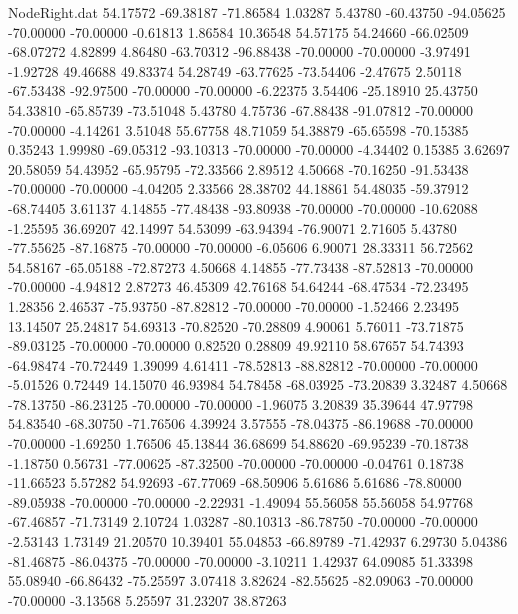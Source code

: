 \begin{filecontents}{NodeRight.dat}
  54.17572  -69.38187  -71.86584     1.03287    5.43780  -60.43750  -94.05625  -70.00000  -70.00000   -0.61813    1.86584   10.36548   54.57175
  54.24660  -66.02509  -68.07272     4.82899    4.86480  -63.70312  -96.88438  -70.00000  -70.00000   -3.97491   -1.92728   49.46688   49.83374
  54.28749  -63.77625  -73.54406    -2.47675    2.50118  -67.53438  -92.97500  -70.00000  -70.00000   -6.22375    3.54406  -25.18910   25.43750
  54.33810  -65.85739  -73.51048     5.43780    4.75736  -67.88438  -91.07812  -70.00000  -70.00000   -4.14261    3.51048   55.67758   48.71059
  54.38879  -65.65598  -70.15385     0.35243    1.99980  -69.05312  -93.10313  -70.00000  -70.00000   -4.34402    0.15385    3.62697   20.58059
  54.43952  -65.95795  -72.33566     2.89512    4.50668  -70.16250  -91.53438  -70.00000  -70.00000   -4.04205    2.33566   28.38702   44.18861
  54.48035  -59.37912  -68.74405     3.61137    4.14855  -77.48438  -93.80938  -70.00000  -70.00000  -10.62088   -1.25595   36.69207   42.14997
  54.53099  -63.94394  -76.90071     2.71605    5.43780  -77.55625  -87.16875  -70.00000  -70.00000   -6.05606    6.90071   28.33311   56.72562
  54.58167  -65.05188  -72.87273     4.50668    4.14855  -77.73438  -87.52813  -70.00000  -70.00000   -4.94812    2.87273   46.45309   42.76168
  54.64244  -68.47534  -72.23495     1.28356    2.46537  -75.93750  -87.82812  -70.00000  -70.00000   -1.52466    2.23495   13.14507   25.24817
  54.69313  -70.82520  -70.28809     4.90061    5.76011  -73.71875  -89.03125  -70.00000  -70.00000    0.82520    0.28809   49.92110   58.67657
  54.74393  -64.98474  -70.72449     1.39099    4.61411  -78.52813  -88.82812  -70.00000  -70.00000   -5.01526    0.72449   14.15070   46.93984
  54.78458  -68.03925  -73.20839     3.32487    4.50668  -78.13750  -86.23125  -70.00000  -70.00000   -1.96075    3.20839   35.39644   47.97798
  54.83540  -68.30750  -71.76506     4.39924    3.57555  -78.04375  -86.19688  -70.00000  -70.00000   -1.69250    1.76506   45.13844   36.68699
  54.88620  -69.95239  -70.18738    -1.18750    0.56731  -77.00625  -87.32500  -70.00000  -70.00000   -0.04761    0.18738  -11.66523    5.57282
  54.92693  -67.77069  -68.50906     5.61686    5.61686  -78.80000  -89.05938  -70.00000  -70.00000   -2.22931   -1.49094   55.56058   55.56058
  54.97768  -67.46857  -71.73149     2.10724    1.03287  -80.10313  -86.78750  -70.00000  -70.00000   -2.53143    1.73149   21.20570   10.39401
  55.04853  -66.89789  -71.42937     6.29730    5.04386  -81.46875  -86.04375  -70.00000  -70.00000   -3.10211    1.42937   64.09085   51.33398
  55.08940  -66.86432  -75.25597     3.07418    3.82624  -82.55625  -82.09063  -70.00000  -70.00000   -3.13568    5.25597   31.23207   38.87263

\end{filecontents}
